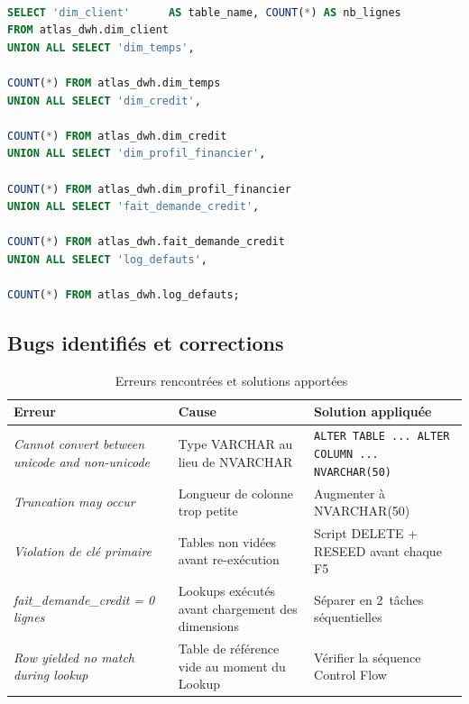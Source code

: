 \documentclass[12pt, a4paper]{report}
\begin{document}
\begin{lstlisting}[language=SQL, caption={Requête de vérification après exécution~\cite{guide_etl}}, label={lst:verif}]

SELECT 'dim_client'      AS table_name, COUNT(*) AS nb_lignes
FROM atlas_dwh.dim_client
UNION ALL SELECT 'dim_temps',

COUNT(*) FROM atlas_dwh.dim_temps
UNION ALL SELECT 'dim_credit',

COUNT(*) FROM atlas_dwh.dim_credit
UNION ALL SELECT 'dim_profil_financier',

COUNT(*) FROM atlas_dwh.dim_profil_financier
UNION ALL SELECT 'fait_demande_credit',

COUNT(*) FROM atlas_dwh.fait_demande_credit
UNION ALL SELECT 'log_defauts',
          
COUNT(*) FROM atlas_dwh.log_defauts;
\end{lstlisting}

\subsection{Bugs identifiés et corrections}

\begin{table}[H]
\centering
\caption{Erreurs rencontrées et solutions apportées~\cite{guide_etl}}
\label{tab:bugs}
\renewcommand{\arraystretch}{1.4}
\begin{tabularx}{\textwidth}{p{4cm} p{5cm} X}
\toprule
\rowcolor{primary!12}
Erreur & Cause & Solution appliquée \\
\midrule
\textit{Cannot convert between unicode and non-unicode} & Type VARCHAR au lieu de NVARCHAR & \texttt{ALTER TABLE ... ALTER COLUMN ... NVARCHAR(50)} \\
\textit{Truncation may occur} & Longueur de colonne trop petite & Augmenter à NVARCHAR(50) \\
\textit{Violation de clé primaire} & Tables non vidées avant re-exécution & Script DELETE + RESEED avant chaque F5 \\
\textit{fait\_demande\_credit = 0 lignes} & Lookups exécutés avant chargement des dimensions & Séparer en 2~tâches séquentielles \\
\textit{Row yielded no match during lookup} & Table de référence vide au moment du Lookup & Vérifier la séquence Control Flow \\
\bottomrule
\end{tabularx}
\end{table}

\end{document}
